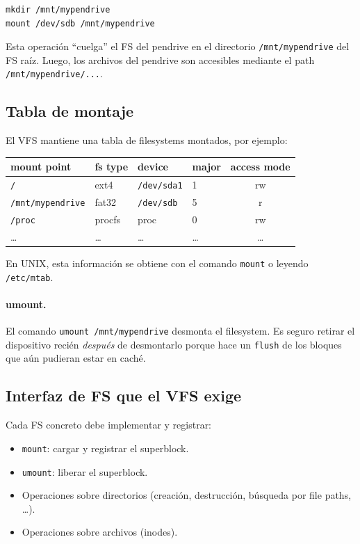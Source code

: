 \documentclass[11pt,a4paper]{article}
\begin{document}
\begin{lstlisting}[style=shellstyle]
mkdir /mnt/mypendrive
mount /dev/sdb /mnt/mypendrive
\end{lstlisting}

Esta operación ``cuelga'' el FS del pendrive en el directorio
\verb|/mnt/mypendrive| del FS raíz. Luego, los archivos del pendrive
son accesibles mediante el path \verb|/mnt/mypendrive/...|.

\subsection{Tabla de montaje}

El VFS mantiene una tabla de filesystems montados, por ejemplo:

\begin{center}
\small
\begin{tabular}{@{}llllc@{}}
\toprule
\textbf{mount point} & \textbf{fs type} & \textbf{device} & \textbf{major} & \textbf{access mode} \\
\midrule
\texttt{/}                & ext4    & \texttt{/dev/sda1} & 1 & rw \\
\texttt{/mnt/mypendrive}  & fat32   & \texttt{/dev/sdb}  & 5 & r \\
\texttt{/proc}            & procfs  & proc               & 0 & rw \\
\ldots                    & \ldots  & \ldots             & \ldots & \ldots \\
\bottomrule
\end{tabular}
\end{center}

En UNIX, esta información se obtiene con el comando \texttt{mount} o
leyendo \verb|/etc/mtab|.

\paragraph{umount.}
El comando \verb|umount /mnt/mypendrive| desmonta el filesystem. Es
seguro retirar el dispositivo recién \emph{después} de desmontarlo
porque hace un \texttt{flush} de los bloques que aún pudieran estar en
caché.

\subsection{Interfaz de FS que el VFS exige}

Cada FS concreto debe implementar y registrar:

\begin{itemize}[leftmargin=*,nosep]
    \item \texttt{mount}: cargar y registrar el superblock.
    \item \texttt{umount}: liberar el superblock.
    \item Operaciones sobre directorios (creación, destrucción,
        búsqueda por file paths, \ldots).
    \item Operaciones sobre archivos (inodes).
\end{itemize}
\end{document}
